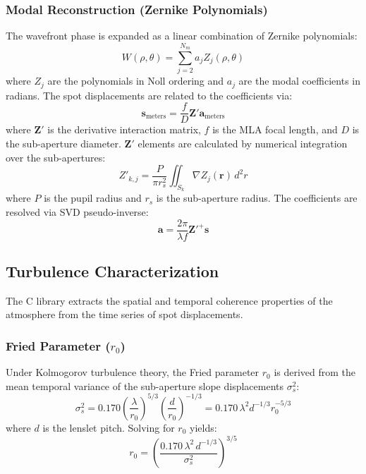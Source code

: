 \documentclass[10pt,journal,compsoc]{IEEEtran}
\begin{document}
\subsubsection{Modal Reconstruction (Zernike Polynomials)}
The wavefront phase is expanded as a linear combination of Zernike polynomials:
\begin{equation}
W(\rho, \theta) = \sum_{j=2}^{N_m} a_j Z_j(\rho, \theta)
\end{equation}
where $Z_j$ are the polynomials in Noll ordering and $a_j$ are the modal coefficients in radians. The spot displacements are related to the coefficients via:
\begin{equation}
\bm{s}_{\text{meters}} = \frac{f}{D} \bm{Z}' \bm{a}_{\text{meters}}
\end{equation}
where $\bm{Z}'$ is the derivative interaction matrix, $f$ is the MLA focal length, and $D$ is the sub-aperture diameter. $\bm{Z}'$ elements are calculated by numerical integration over the sub-apertures:
\begin{equation}
Z'_{k, j} = \frac{P}{\pi r_s^2}\iint_{S_k} \nabla Z_j(\bm{r}) \, d^2r
\end{equation}
where $P$ is the pupil radius and $r_s$ is the sub-aperture radius. The coefficients are resolved via SVD pseudo-inverse:
\begin{equation}
\bm{a} = \frac{2\pi}{\lambda f} \bm{Z}'^{+} \bm{s}
\end{equation}

\subsection{Turbulence Characterization}
The C library extracts the spatial and temporal coherence properties of the atmosphere from the time series of spot displacements.

\subsubsection{Fried Parameter ($r_0$)}
Under Kolmogorov turbulence theory, the Fried parameter $r_0$ is derived from the mean temporal variance of the sub-aperture slope displacements $\sigma_s^2$:
\begin{equation}
\sigma_s^2 = 0.170 \left(\frac{\lambda}{r_0}\right)^{5/3} \left(\frac{d}{r_0}\right)^{-1/3} \!\! = 0.170\,\lambda^2 d^{-1/3} r_0^{-5/3}
\end{equation}
where $d$ is the lenslet pitch. Solving for $r_0$ yields:
\begin{equation}
r_0 = \left(\frac{0.170 \, \lambda^2 \, d^{-1/3}}{\sigma_s^2}\right)^{3/5}
\end{equation}
\end{document}
